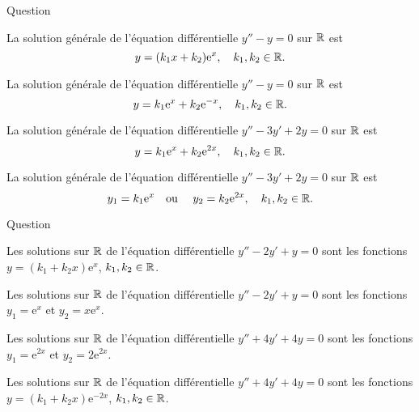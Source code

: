 \begin{multi}[multiple,feedback=
{Les solutions de l'équation caractéristique \(r^2-1=0\) sont \(\pm 1\). Donc la solution générale de \(y''-y=0\) est \(y=k_1\mathrm{e}^{x}+k_2\mathrm{e}^{-x}\), \(k_1,k_2\in \Rr\).
\vskip0mm
\noindent Les solutions de l'équation caractéristique \(r^2-3r+2=0\) sont \(1\) et \(2\). Donc la solution générale de \(y''-3y'+2y=0\) est \(y=k_1\mathrm{e}^{x}+k_2\mathrm{e}^{2x}\), \(k_1,k_2\in \Rr\).
}]{Question}
    \item La solution générale de l'équation différentielle \(y''-y=0\) sur \(\mathbb{R}\) est
\[\displaystyle y=(k_1x+k_2)\mathrm{e}^{x},\quad k_1,k_2\in \mathbb{R}.\]
    \item* La solution générale de l'équation différentielle \(y''-y=0\) sur \(\mathbb{R}\) est
\[\displaystyle y=k_1\mathrm{e}^{x}+k_2\mathrm{e}^{-x},\quad k_1,k_2\in \mathbb{R}.\]
    \item* La solution générale de l'équation différentielle \(y''-3y'+2y=0\) sur \(\mathbb{R}\) est
\[\displaystyle y=k_1\mathrm{e}^{x}+k_2\mathrm{e}^{2x},\quad k_1,k_2\in \mathbb{R}.\]
    \item La solution générale de l'équation différentielle \(y''-3y'+2y=0\) sur \(\mathbb{R}\) est
\[\displaystyle y_1=k_1\mathrm{e}^{x}\quad \mbox{ou }\quad y_2=k_2\mathrm{e}^{2x},\quad k_1,k_2\in \mathbb{R}.\]
\end{multi}


\begin{multi}[multiple,feedback=
{L'équation caractéristique \(r^2-2r+1=0\) admet \(1\) comme racine double. Donc la solution générale de \(y''-2y'+y=0\) est \(y=(k_1+k_2x)\mathrm{e}^{x}\), \(k_1,k_2\in \Rr\).
\vskip0mm
L'équation caractéristique \(r^2+4r+4=0\) admet \(-2\) comme racine double. Donc la solution générale de \(y''+4y'+4y=0\) est \(y=(k_1+k_2x)\mathrm{e}^{-2x}\), \(k_1,k_2\in \Rr\).
}]{Question}
    \item* Les solutions sur \(\mathbb{R}\) de l'équation différentielle \(y''-2y'+y=0\) sont les fonctions \(\displaystyle y=(k_1+k_2x)\mathrm{e}^{x}\), \(k_1,k_2\in \Rr\).
    \item Les solutions sur \(\mathbb{R}\) de l'équation différentielle \(y''-2y'+y=0\) sont les fonctions \(\displaystyle y_1=\mathrm{e}^{x}\) et \(\displaystyle y_2=x\mathrm{e}^{x}\).
    \item Les solutions sur \(\mathbb{R}\) de l'équation différentielle \(y''+4y'+4y=0\) sont les fonctions \(\displaystyle y_1=\mathrm{e}^{2x}\) et \(y_2=2\mathrm{e}^{2x}\).
    \item* Les solutions sur \(\mathbb{R}\) de l'équation différentielle \(y''+4y'+4y=0\) sont les fonctions \(\displaystyle y=(k_1+k_2x)\mathrm{e}^{-2x}\), \(k_1,k_2\in \Rr\).
\end{multi}


